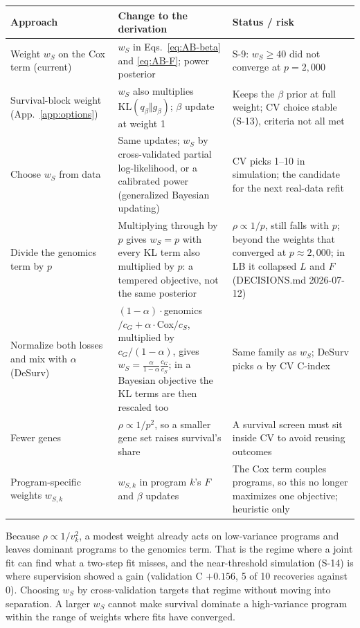 \documentclass[11pt]{article}
\newcommand{\KL}{\mathrm{KL}}
\newcommand{\ws}{w_S}
\begin{document}
\begin{center}
\begin{tabularx}{\textwidth}{>{\raggedright\arraybackslash}p{3.3cm}>{\raggedright\arraybackslash}X>{\raggedright\arraybackslash}p{4.2cm}}
\toprule
Approach & Change to the derivation & Status / risk \\
\midrule
Weight $\ws$ on the Cox term (current) & $\ws$ in Eqs.~\eqref{eq:AB-beta} and \eqref{eq:AB-F}; power posterior & S-9: $\ws\ge 40$ did not converge at $p=2{,}000$ \\
Survival-block weight (App.~\ref{app:options}) & $\ws$ also multiplies $\KL(q_\beta\Vert g_\beta)$; $\beta$ update at weight 1 & Keeps the $\beta$ prior at full weight; CV choice stable (S-13), criteria not all met \\
Choose $\ws$ from data & Same updates; $\ws$ by cross-validated partial log-likelihood, or a calibrated power (generalized Bayesian updating) & CV picks 1--10 in simulation; the candidate for the next real-data refit \\
Divide the genomics term by $p$ & Multiplying through by $p$ gives $\ws = p$ with every KL term also multiplied by $p$: a tempered objective, not the same posterior & $\rho\propto 1/p$, still falls with $p$; beyond the weights that converged at $p\approx 2{,}000$; in LB it collapsed $L$ and $F$ (DECISIONS.md 2026-07-12) \\
Normalize both losses and mix with $\alpha$ (DeSurv) & $(1-\alpha)\cdot$genomics$/c_G + \alpha\cdot$Cox$/c_S$, multiplied by $c_G/(1-\alpha)$, gives $\ws = \tfrac{\alpha}{1-\alpha}\tfrac{c_G}{c_S}$; in a Bayesian objective the KL terms are then rescaled too & Same family as $\ws$; DeSurv picks $\alpha$ by CV C-index \\
Fewer genes & $\rho\propto 1/p^2$, so a smaller gene set raises survival's share & A survival screen must sit inside CV to avoid reusing outcomes \\
Program-specific weights $w_{S,k}$ & $w_{S,k}$ in program $k$'s $F$ and $\beta$ updates & The Cox term couples programs, so this no longer maximizes one objective; heuristic only \\
\bottomrule
\end{tabularx}
\end{center}

\begin{keybox}
Because $\rho\propto 1/v_k^2$, a modest weight already acts on low-variance
programs and leaves dominant programs to the genomics term. That is the regime
where a joint fit can find what a two-step fit misses, and the near-threshold
simulation (S-14) is where supervision showed a gain (validation C $+0.156$,
5 of 10 recoveries against 0). Choosing $\ws$ by cross-validation targets that
regime without moving into separation. A larger $\ws$ cannot make survival
dominate a high-variance program within the range of weights where fits have
converged.
\end{keybox}
\end{document}
